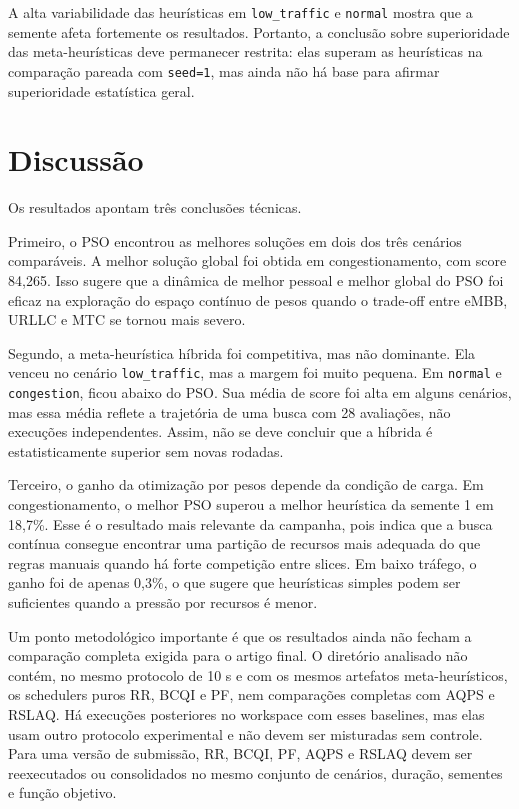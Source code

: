 \documentclass[12pt,a4paper]{article}
\begin{document}
A alta variabilidade das heurísticas em \texttt{low\_traffic} e \texttt{normal} mostra que a semente afeta fortemente os resultados. Portanto, a conclusão sobre superioridade das meta-heurísticas deve permanecer restrita: elas superam as heurísticas na comparação pareada com \texttt{seed=1}, mas ainda não há base para afirmar superioridade estatística geral.

\section{Discussão}

Os resultados apontam três conclusões técnicas.

Primeiro, o PSO encontrou as melhores soluções em dois dos três cenários comparáveis. A melhor solução global foi obtida em congestionamento, com score 84,265. Isso sugere que a dinâmica de melhor pessoal e melhor global do PSO foi eficaz na exploração do espaço contínuo de pesos quando o trade-off entre eMBB, URLLC e MTC se tornou mais severo.

Segundo, a meta-heurística híbrida foi competitiva, mas não dominante. Ela venceu no cenário \texttt{low\_traffic}, mas a margem foi muito pequena. Em \texttt{normal} e \texttt{congestion}, ficou abaixo do PSO. Sua média de score foi alta em alguns cenários, mas essa média reflete a trajetória de uma busca com 28 avaliações, não execuções independentes. Assim, não se deve concluir que a híbrida é estatisticamente superior sem novas rodadas.

Terceiro, o ganho da otimização por pesos depende da condição de carga. Em congestionamento, o melhor PSO superou a melhor heurística da semente 1 em 18,7\%. Esse é o resultado mais relevante da campanha, pois indica que a busca contínua consegue encontrar uma partição de recursos mais adequada do que regras manuais quando há forte competição entre slices. Em baixo tráfego, o ganho foi de apenas 0,3\%, o que sugere que heurísticas simples podem ser suficientes quando a pressão por recursos é menor.

Um ponto metodológico importante é que os resultados ainda não fecham a comparação completa exigida para o artigo final. O diretório analisado não contém, no mesmo protocolo de 10 s e com os mesmos artefatos meta-heurísticos, os schedulers puros RR, BCQI e PF, nem comparações completas com AQPS e RSLAQ. Há execuções posteriores no workspace com esses baselines, mas elas usam outro protocolo experimental e não devem ser misturadas sem controle. Para uma versão de submissão, RR, BCQI, PF, AQPS e RSLAQ devem ser reexecutados ou consolidados no mesmo conjunto de cenários, duração, sementes e função objetivo.
\end{document}
